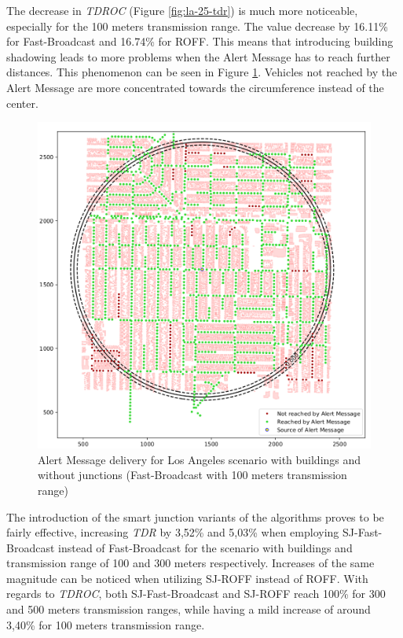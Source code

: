 		
		The decrease in \textit{TDROC} (Figure \ref{fig:la-25-tdr}) is much more noticeable, especially for the 100 meters transmission range. The value decrease by 16.11\% for Fast-Broadcast and 16.74\% for ROFF. This means that introducing building shadowing leads to more problems when the Alert Message has to reach further distances. This phenomenon can be seen in Figure \ref{fig:la-coverage-fb100}.
		Vehicles not reached by the Alert Message are more concentrated towards the circumference instead of the center.
		
		\begin{figure}[H]
			\centering
			\includegraphics[width=1.0\textwidth]{immagini/la-25/la-coverage-fb100}
			\caption{Alert Message delivery for Los Angeles scenario with buildings and without junctions (Fast-Broadcast with 100 meters transmission range)}
			\label{fig:la-coverage-fb100}
		\end{figure}
		
		The introduction of the smart junction variants of the algorithms proves to be fairly effective, increasing \textit{TDR} by 3,52\% and 5,03\% when employing SJ-Fast-Broadcast instead of Fast-Broadcast for the scenario with buildings and transmission range of 100 and 300 meters respectively. Increases of the same magnitude can be noticed when utilizing SJ-ROFF instead of ROFF. With regards to \textit{TDROC}, both SJ-Fast-Broadcast and SJ-ROFF reach 100\% for 300 and 500 meters transmission ranges, while having a mild increase of around 3,40\% for 100 meters transmission range.
		
